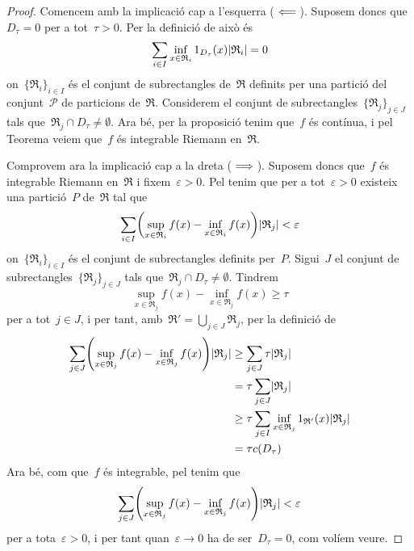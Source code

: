 \documentclass[../../main.tex]{subfiles}
\begin{document}
    \begin{proof}
        Comencem amb la implicació cap a l'esquerra (\(\impliedby\)).
        Suposem doncs que~\(D_{\tau}=0\) per a tot~\(\tau>0\).
        Per la definició de  això és
        \[
            \sum_{i\in I}\inf_{x\in \mathfrak{R}_{i}}1_{D_{\tau}}(x)\abs{\mathfrak{R}_{i}}=0
        \]
        on~\(\{\mathfrak{R}_{i}\}_{i\in I}\) és el conjunt de subrectangles de~\(\mathfrak{R}\) definits per una partició del conjunt~\(\mathcal{P}\) de particions de~\(\mathfrak{R}\).
        Considerem el conjunt de subrectangles~\(\{\mathfrak{R}_{j}\}_{j\in J}\) tals que~\(\mathfrak{R}_{j}\cap D_{\tau}\neq\emptyset\).
        Ara bé, per la proposició  tenim que~\(f\) és contínua, i pel Teorema  veiem que~\(f\) és integrable Riemann en~\(\mathfrak{R}\).

        Comprovem ara la implicació cap a la dreta (\(\implies\)).
        Suposem doncs que~\(f\) és integrable Riemann en~\(\mathfrak{R}\) i fixem~\(\varepsilon>0\).
        Pel  tenim que per a tot~\(\varepsilon>0\) existeix una partició~\(P\) de~\(\mathfrak{R}\) tal que
        \[
            \sum_{i\in I}\left(\sup_{x\in \mathfrak{R}_{i}}f(x)-\inf_{x\in \mathfrak{R}_{i}}f(x)\right)\abs{\mathfrak{R}_{j}}<\varepsilon
        \]
        on~\(\{\mathfrak{R}_{i}\}_{i\in I}\) és el conjunt de subrectangles definits per~\(P\).
        Sigui~\(J\) el conjunt de subrectangles~\(\{\mathfrak{R}_{j}\}_{j\in J}\) tals que~\(\mathfrak{R}_{j}\cap D_{\tau}\neq\emptyset\).
        Tindrem
        \[
            \sup_{x\in \mathfrak{R}_{j}}f(x)-\inf_{x\in \mathfrak{R}_{j}}f(x)\geq\tau
        \]
        per a tot~\(j\in J\), i per tant, amb~\(\mathfrak{R}'=\bigcup_{j\in J}\mathfrak{R}_{j}\), per la definició de 
        \begin{align*}
            \sum_{j\in J}\left(\sup_{x\in \mathfrak{R}_{j}}f(x)-\inf_{x\in \mathfrak{R}_{j}}f(x)\right)\abs{\mathfrak{R}_{j}}&\geq\sum_{j\in J}\tau\abs{\mathfrak{R}_{j}}\\
            &=\tau\sum_{j\in J}\abs{\mathfrak{R}_{j}}\\
            &\geq\tau\sum_{j\in I}\inf_{x\in \mathfrak{R}_{j}}1_{\mathfrak{R}'}(x)\abs{\mathfrak{R}_{j}}\\
            &=\tau c(D_{\tau})
        \end{align*}
        Ara bé, com que~\(f\) és integrable, pel  tenim que
        \[
            \sum_{j\in J}\left(\sup_{x\in \mathfrak{R}_{j}}f(x)-\inf_{x\in \mathfrak{R}_{j}}f(x)\right)\abs{\mathfrak{R}_{j}}<\varepsilon
        \]
        per a tota~\(\varepsilon>0\), i per tant quan~\(\varepsilon\to0\) ha de ser~\(D_{\tau}=0\), com volíem veure.
    \end{proof}
\end{document}
